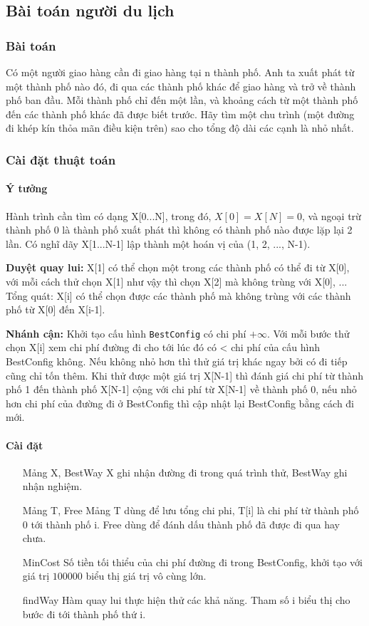 \documentclass[8pt, a4paper]{article}
\begin{document}
\subsection{Bài toán người du lịch}

\subsubsection{Bài toán}
Có một người giao hàng cần đi giao hàng tại n thành phố. Anh ta xuất phát từ một thành phố nào đó, đi qua các thành phố khác để giao hàng và trở về thành phố ban đầu. Mỗi thành phố chỉ đến một lần, và khoảng cách từ một thành phố đến các thành phố khác đã được biết trước. Hãy tìm một chu trình (một đường đi khép kín thỏa mãn điều kiện trên) sao cho tổng độ dài các cạnh là nhỏ nhất.

\subsubsection{Cài đặt thuật toán}
\paragraph{Ý tưởng}

Hành trình cần tìm có dạng X[0...N], trong đó, $X[0] = X[N] = 0$, và ngoại trừ thành phố 0 là thành phố xuất phát thì không có thành phố nào được lặp lại 2 lần. Có nghĩ dãy X[1...N-1] lập thành một hoán vị của (1, 2, ..., N-1).

\textbf{Duyệt quay lui: } X[1] có thể chọn một trong các thành phố có thể đi từ X[0], với mỗi cách thử chọn X[1] như vậy thì chọn X[2] mà không trùng với X[0], ... Tổng quát: X[i] có thể chọn được các thành phố mà không trùng với các thành phố từ X[0] đến X[i-1].

\textbf{Nhánh cận:} Khởi tạo cấu hình \texttt{BestConfig} có chi phí $ +\infty $. Với mỗi bước thử chọn X[i] xem chi phí đường đi cho tới lúc đó có < chi phí của cấu hình BestConfig không. Nếu không nhỏ hơn thì thử giá trị khác ngay bởi có đi tiếp cũng chỉ tốn thêm. Khi thử được một giá trị X[N-1] thì đánh giá chi phí từ thành phố 1 đến thành phố X[N-1] cộng với chi phí từ X[N-1] về thành phố 0, nếu nhỏ hơn chi phí của đường đi ở BestConfig thì cập nhật lại BestConfig bằng cách đi mới.

\paragraph{Cài đặt}
\begin{itemize}
\item [Mảng X, BestWay] X ghi nhận đường đi trong quá trình thử, BestWay ghi nhận nghiệm.
\item [Mảng T, Free] Mảng T dùng để lưu tổng chi phi, T[i] là chi phí từ thành phố 0 tới thành phố i. Free dùng để đánh dấu thành phố đã được đi qua hay chưa.
\item [MinCost] Số tiền tối thiểu của chi phí đường đi trong BestConfig, khởi tạo với giá trị $100000$ biểu thị giá trị vô cùng lớn.
\item [findWay] Hàm quay lui thực hiện thử các khả năng. Tham số i biểu thị cho bước đi tới thành phố thứ i.
\end{itemize}
\end{document}

